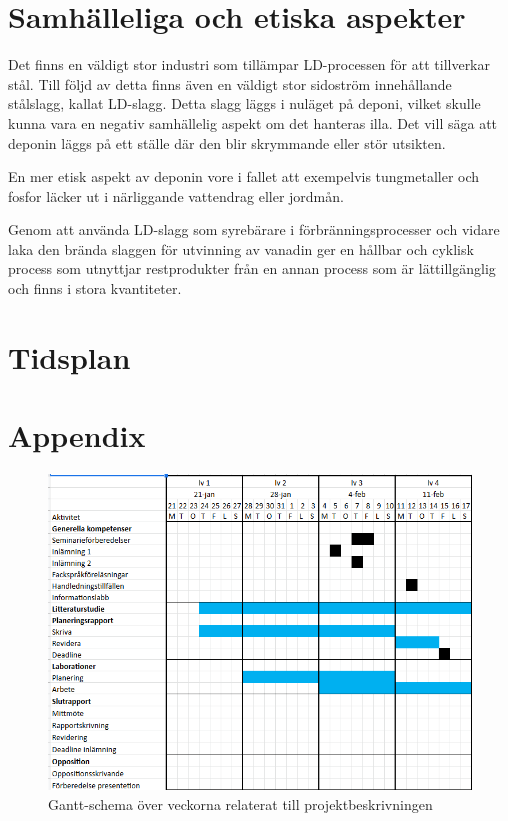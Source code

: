 \documentclass{article}
\begin{document}
\section{Samhälleliga och etiska aspekter}
Det finns en  väldigt stor industri som tillämpar LD-processen för att tillverkar stål. Till följd av detta finns även en väldigt stor sidoström innehållande stålslagg, kallat LD-slagg. Detta slagg läggs i nuläget på deponi, vilket skulle kunna vara en negativ samhällelig aspekt om det hanteras illa. Det vill säga att deponin läggs på ett ställe där den blir skrymmande eller stör utsikten. 

En mer etisk aspekt av deponin vore i fallet att exempelvis tungmetaller och fosfor läcker ut i närliggande vattendrag eller jordmån.

Genom att använda LD-slagg som syrebärare i förbränningsprocesser och vidare laka den brända slaggen för utvinning av vanadin ger en hållbar och cyklisk process som utnyttjar restprodukter från en annan process som är lättillgänglig och finns i stora kvantiteter.
\section{Tidsplan}


\printbibliography
\appendix
\section{Appendix}
\begin{figure}[H]
    \centering
    \includegraphics[scale=0.7]{Gantt.PNG}
    \caption{Gantt-schema över veckorna relaterat till projektbeskrivningen}
    \label{fig:Gantt}
\end{figure}
\end{document}
